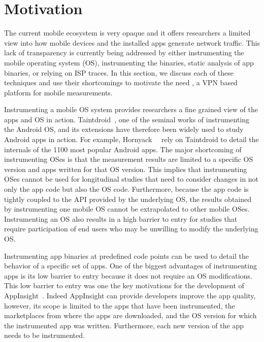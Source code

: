 \section{Motivation}
\label{sec:motivation}

The current mobile ecosystem is very opaque and it offers researchers  a limited view into how mobile devices and the installed apps generate network traffic. 
This lack of transparency is currently being addressed by either instrumenting the mobile operating system (OS), instrumenting the binaries, static analysis of app binaries, or relying on ISP traces. 
In this section, we discuss each of these techniques and use their  shortcomings to motivate the need \platname, a VPN based platform for mobile measurements.      

Instrumenting a mobile OS system provides researchers a fine grained view of the apps and OS in action. Taintdroid~\cite{enck:taintdroid}, one of the seminal works of instrumenting the Android OS, and its extensions have therefore been widely used to study Android apps in action. 
For example, Hornyack~\etal~\cite{hornyack:appfence} rely on Taintdroid to detail the internals of the 1100 most popular Android apps. 
The major shortcoming of instrumenting OSes is that the measurement results are limited to a specific OS version and apps written for that OS version. 
This implies that instrumenting OSes cannot be used for longitudinal studies that need to consider changes in not only the app code but also the OS code.
Furthermore, because the app code is tightly coupled to the API provided by the underlying OS, the results obtained by instrumenting  one mobile OS cannot be extrapolated to other mobile OSes. 
Instrumenting an OS also results in a high barrier to entry for studies that require participation of end users  who may be unwilling to modify the underlying OS. 

Instrumenting app binaries at predefined code points can be used to detail the behavior of a specific set of apps. 
One of the biggest advantages of  instrumenting apps is its low barrier to entry because it does not require an OS modifications. 
This low barrier to entry was one the key motivations for the development of AppInsight~\cite{ravindranath:appinsight}.
Indeed AppInsight can provide developers improve the app quality, however, its scope is limited to the apps that have been instrumented, the marketplaces from where the apps are downloaded, and the OS version for which the instrumented app was written. 
Furthermore, each new version of the app needs to be instrumented.

